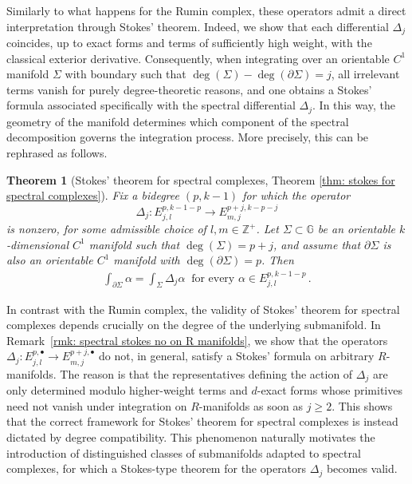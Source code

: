 \documentclass[dvipsnames]{amsart}
\newtheorem{theoremAlph}{Theorem}
\theoremstyle{definition}
\theoremstyle{definition}
\numberwithin{equation}{section}
\begin{document}
Similarly to what happens for the Rumin complex, these operators admit a direct interpretation through Stokes' theorem. Indeed, we show that each differential $\Delta_j$ coincides, up to exact forms and terms of sufficiently high weight, with the classical exterior derivative. Consequently, when integrating over an orientable $C^1$ manifold $\Sigma$ with boundary such that $\operatorname{deg}(\Sigma)-\operatorname{deg}(\partial\Sigma)=j$, all irrelevant terms vanish for purely degree-theoretic reasons, and one obtains a Stokes' formula associated specifically with the spectral differential $\Delta_j$. In this way, the geometry of the manifold determines which component of the spectral decomposition governs the integration process. More precisely, this can be rephrased as follows.
\begin{theoremAlph}
[Stokes' theorem for spectral complexes, Theorem \ref{thm: stokes for spectral complexes}] \label{thm: B}Fix a bidegree $(p,k-1)$ for which the operator $$\Delta_j\colon E_{j,l}^{p,k-1-p}\longrightarrow E_{m,j}^{p+j,k-p-j}$$
is nonzero, for some admissible choice of $l,m\in\mathbb{Z}^+$. Let $\Sigma\subset\mathbb{G}$ be an orientable $k$-dimensional $C^1$ manifold such that $\operatorname{deg}(\Sigma)=p+j$, and assume that $\partial\Sigma$ is also an orientable $C^1$ manifold with $\operatorname{deg}(\partial\Sigma)=p$. Then
\begin{align*}
    \int_{\partial\Sigma}\alpha=\int_\Sigma \Delta_j\alpha\ \text{ for every }\alpha\in E_{j,l}^{p,k-1-p}\,.
\end{align*}
\end{theoremAlph}

In contrast with the Rumin complex, the validity of Stokes' theorem for spectral complexes depends crucially on the degree of the underlying submanifold. In Remark~\ref{rmk: spectral stokes no on R manifolds}, we show that the operators $\Delta_j\colon E_{j,l}^{p,\bullet}\longrightarrow E_{m,j}^{p+j,\bullet}$ do not, in general, satisfy a Stokes' formula on arbitrary $R$-manifolds. The reason is that the representatives defining the action of $\Delta_j$ are only determined modulo higher-weight terms and $d$-exact forms whose primitives need not vanish under integration on $R$-manifolds as soon as $j\ge 2$. This shows that the correct framework for Stokes' theorem for spectral complexes is instead dictated by degree compatibility.
This phenomenon naturally motivates the introduction of distinguished classes of submanifolds adapted to spectral complexes, for which a Stokes-type theorem for the operators $\Delta_j$
 becomes valid.
\end{document}
